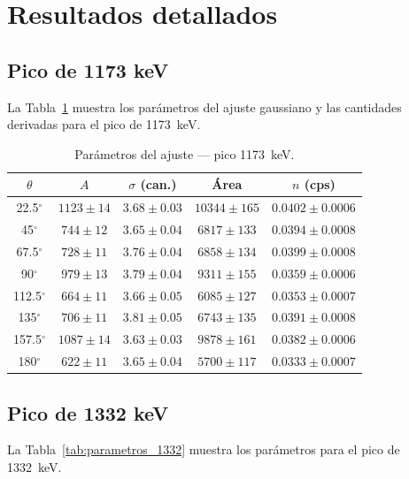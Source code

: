 \documentclass[11pt,a4paper]{article}
\begin{document}
\newpage
\section{Resultados detallados}

\subsection{Pico de 1173 keV}

La Tabla~\ref{tab:parametros_1173} muestra los par\'ametros del ajuste
gaussiano y las cantidades derivadas para el pico de 1173~keV.

\begin{table}[ht]
  \centering
  \caption{Par\'ametros del ajuste — pico 1173~keV.}
  \label{tab:parametros_1173}
  \small
  \begin{tabular}{c|c|c|c|c}
    \hline
    $\theta$ & $A$ & $\sigma$ (can.) & \'{A}rea & $n$ (cps) \\
    \hline
    22.5$^\circ$  & $1123 \pm 14$ & $3.68 \pm 0.03$ & $10344 \pm 165$ & $0.0402 \pm 0.0006$ \\
    45$^\circ$    & $744 \pm 12$  & $3.65 \pm 0.04$ & $6817 \pm 133$  & $0.0394 \pm 0.0008$ \\
    67.5$^\circ$  & $728 \pm 11$  & $3.76 \pm 0.04$ & $6858 \pm 134$  & $0.0399 \pm 0.0008$ \\
    90$^\circ$    & $979 \pm 13$  & $3.79 \pm 0.04$ & $9311 \pm 155$  & $0.0359 \pm 0.0006$ \\
    112.5$^\circ$ & $664 \pm 11$  & $3.66 \pm 0.05$ & $6085 \pm 127$  & $0.0353 \pm 0.0007$ \\
    135$^\circ$   & $706 \pm 11$  & $3.81 \pm 0.05$ & $6743 \pm 135$  & $0.0391 \pm 0.0008$ \\
    157.5$^\circ$ & $1087 \pm 14$ & $3.63 \pm 0.03$ & $9878 \pm 161$  & $0.0382 \pm 0.0006$ \\
    180$^\circ$   & $622 \pm 11$  & $3.65 \pm 0.04$ & $5700 \pm 117$  & $0.0333 \pm 0.0007$ \\
    \hline
  \end{tabular}
\end{table}

\subsection{Pico de 1332 keV}

La Tabla~\ref{tab:parametros_1332} muestra los par\'ametros para el pico de
1332~keV.
\end{document}
